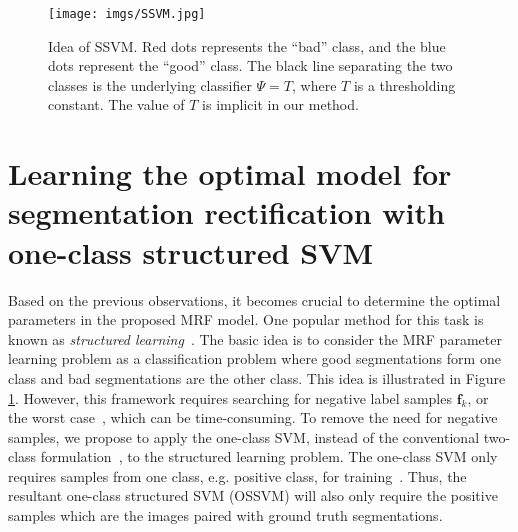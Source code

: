 \documentclass[10pt,journal,compsoc]{newIEEEtran}
\begin{document}
\begin{figure}[t]
  \centering
  \texttt{[image: imgs/SSVM.jpg]}
  \caption{Idea of SSVM. Red dots represents the ``bad'' class, and the blue dots represent the ``good'' class. The black line separating the two classes is the underlying classifier $\Psi=T$, where $T$ is a thresholding constant. The value of $T$ is implicit in our method.}\label{fig:SSVM}
\end{figure}\section{Learning the optimal model for segmentation rectification with one-class structured SVM}\label{SEC:OSSVM}

Based on the previous observations, it becomes crucial to determine the optimal parameters in the proposed MRF model. One popular method for this task is known as
\emph{structured learning}~\cite{Taskar05LargeMargin,Tsochantaridis05LargeMarginSSVM,Szummer08LearnCRFbyGC,Joachims2009CuttingPlaneSSVM}. The basic idea is to consider the MRF parameter learning problem as a classification problem where good segmentations form one class and bad segmentations are the other class. This idea is illustrated in Figure \ref{fig:SSVM}. However, this framework requires searching for negative label samples $\mathbf{f}_k$, or the worst case~\cite{Taskar05LargeMargin,Tsochantaridis05LargeMarginSSVM,Szummer08LearnCRFbyGC,Joachims2009CuttingPlaneSSVM}, which can be time-consuming. To remove the need for negative samples, we propose to apply the one-class SVM, instead of the conventional two-class formulation~\cite{Taskar05LargeMargin}, to the structured learning problem. The one-class SVM only requires samples from one class, e.g. positive class, for training~\cite{Scholkopf01oneclassSVM,chen2001one,manevitz2002one}. Thus, the resultant one-class structured SVM (OSSVM) will also only require the positive samples which are the images paired with ground truth segmentations.
\end{document}
